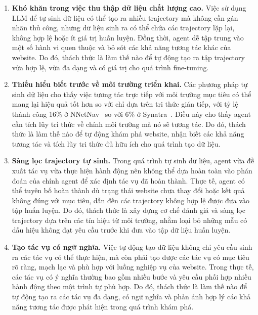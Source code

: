 \begin{enumerate}
  \item \textbf{Khó khăn trong việc thu thập dữ liệu chất lượng cao.} 
  Việc sử dụng LLM để tự sinh dữ liệu có thể tạo ra nhiều trajectory mà không cần gán nhãn thủ công, nhưng dữ liệu sinh ra có thể chứa các trajectory lặp lại, không hợp lệ hoặc ít giá trị huấn luyện. Đồng thời, agent dễ tập trung vào một số hành vi quen thuộc và bỏ sót các khả năng tương tác khác của website. Do đó, thách thức là làm thế nào để tự động tạo ra tập trajectory vừa hợp lệ, vừa đa dạng và có giá trị cho quá trình fine-tuning.

  \item \textbf{Thiếu hiểu biết trước về môi trường triển khai.} 
  Các phương pháp tự sinh dữ liệu cho thấy việc tương tác trực tiếp với môi trường mục tiêu có thể mang lại hiệu quả tốt hơn so với chỉ dựa trên tri thức gián tiếp, với tỷ lệ thành công 16\% ở NNetNav~\cite{murty2024nnetnav} so với 6\% ở Synatra~\cite{ou2024synatra}. Điều này cho thấy agent cần tích lũy tri thức về chính môi trường mà nó sẽ tương tác. Do đó, thách thức là làm thế nào để tự động khám phá website, nhận biết các khả năng tương tác và tích lũy tri thức đủ hữu ích cho quá trình tạo dữ liệu.

  \item \textbf{Sàng lọc trajectory tự sinh.} 
  Trong quá trình tự sinh dữ liệu, agent vừa đề xuất tác vụ vừa thực hiện hành động nên không thể dựa hoàn toàn vào phán đoán của chính agent để xác định tác vụ đã hoàn thành. Thực tế, agent có thể tuyên bố hoàn thành dù trạng thái website chưa thay đổi hoặc kết quả không đúng với mục tiêu, dẫn đến các trajectory không hợp lệ được đưa vào tập huấn luyện. Do đó, thách thức là xây dựng cơ chế đánh giá và sàng lọc trajectory dựa trên các tín hiệu từ môi trường, nhằm loại bỏ những mẫu có dấu hiệu không đạt yêu cầu trước khi đưa vào tập dữ liệu huấn luyện.

  \item \textbf{Tạo tác vụ có ngữ nghĩa.} 
  Việc tự động tạo dữ liệu không chỉ yêu cầu sinh ra các tác vụ có thể thực hiện, mà còn phải tạo được các tác vụ có mục tiêu rõ ràng, mạch lạc và phù hợp với luồng nghiệp vụ của website. Trong thực tế, các tác vụ có ý nghĩa thường bao gồm nhiều bước và yêu cầu phối hợp nhiều hành động theo một trình tự phù hợp. Do đó, thách thức là làm thế nào để tự động tạo ra các tác vụ đa dạng, có ngữ nghĩa và phản ánh hợp lý các khả năng tương tác được phát hiện trong quá trình khám phá.

\end{enumerate}

